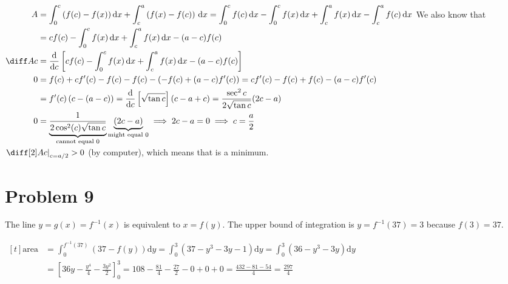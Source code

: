 \documentclass[preview, margin=0.6in]{standalone}
\newcommand*{\problem}[1]{\section*{Problem #1}}
\newcommand*{\deriv}[1][x]{\ensuremath{\dfrac{\mathrm{d}}{\mathrm{d}#1}}}
\begin{document}
$\begin{aligned}[t]
	A
	&=\int_{0}^{c}\left(f(c)-f(x)\right)\mathrm{d}x+\int_{c}^{a}\left(f(x)-f(c)\right)\,\mathrm{d}x
	=\int_{0}^{c}f(c)\,\mathrm{d}x-\int_{0}^{c}f(x)\,\mathrm{d}x+\int_{c}^{a}f(x)\,\mathrm{d}x-\int_{c}^{a}f(c)\,\mathrm{d}x \\
	&=cf(c)-\int_{0}^{c}f(x)\,\mathrm{d}x+\int_{c}^{a}f(x)\,\mathrm{d}x-(a-c)f(c) \\
	\diff Ac
	&=\deriv[c]\left[cf(c)-\int_{0}^{c}f(x)\,\mathrm{d}x+\int_{c}^{a}f(x)\,\mathrm{d}x-(a-c)f(c)\right] \\
	0&=f(c)+cf'(c)-f(c)-f(c)-\left(-f(c)+(a-c)f'(c)\right)
	=cf'(c)-f(c)+f(c)-(a-c)f'(c) \\
	&=f'(c) \left(c-(a-c)\right)
	=\deriv[c]\left[\sqrt{\tan c}\right](c-a+c)
	=\frac{\sec^2c}{2 \sqrt{\tan c}}(2c-a) \\
	0&=\underbrace{\frac{1}{2 \cos^2(c) \sqrt{\tan c}}}_{\text{cannot equal $0$}}\underbrace{(2c-a)}_{\text{might equal $0$}}
	\implies 2c-a=0
	\implies c=\frac{a}{2}
\end{aligned}$
We also know that $\left.\diff[2]Ac\right|_{c=a/2}>0$ (by computer), which means that  is a minimum.

\problem{9}
The line $y=g(x)=f^{-1}(x)$ is equivalent to $x=f(y)$. The upper bound of integration is $y=f^{-1}(37)=3$ because $f(3)=37$.

$\begin{aligned}[t]
	\text{area}
	&=\int_{0}^{f^{-1}(37)}\left(37-f(y)\right)\mathrm{d}y
	=\int_{0}^{3}\left(37-y^3-3y-1\right)\mathrm{d}y
	=\int_{0}^{3}\left(36-y^3-3y\right)\mathrm{d}y \\
	&=\left[36y-\frac{y^4}{4}-\frac{3y^2}{2}\right]_{0}^{3}
	=108-\frac{81}{4}-\frac{27}{2}-0+0+0
	=\frac{432-81-54}{4}
	=\boxed{\frac{297}{4}}
\end{aligned}$
\end{document}
